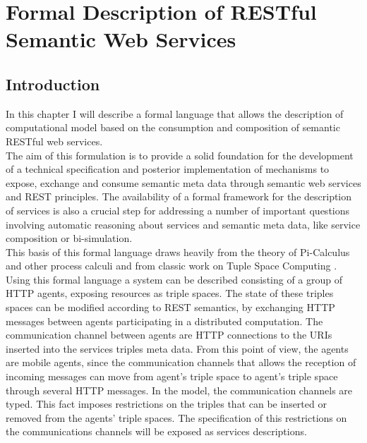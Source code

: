 \chapter{Formal Description of RESTful Semantic Web Services  \label{capituloFD}}

\section{Introduction}
In this chapter I will describe a formal language that allows the description of computational model based on the consumption
and composition of semantic RESTful web services.\\

The aim of this formulation is to provide a solid foundation for the development of a technical specification and
posterior implementation of mechanisms to expose, exchange and consume semantic meta data through semantic web services
and REST principles. The availability of a formal framework for the description of services is also a crucial step for
addressing a number of important questions involving automatic reasoning about services and semantic meta data, like
service composition or bi-simulation.\\

This basis of this formal language draws heavily from the theory of
Pi-Calculus \cite{Milner99communicating} and other process calculi and from classic work on Tuple Space Computing
\cite{Gelernter85generativecommunication}.\\

Using this formal language a system can be described consisting of a group of HTTP agents, exposing resources as
triple spaces. The state of these triples spaces can be modified according to REST semantics, by exchanging HTTP messages between agents
participating in a distributed computation. The communication channel between agents are HTTP connections to the URIs
inserted into the services triples meta data. From this point of view, the agents are mobile agents, since the
communication channels that allows the reception of incoming messages can move from agent's triple space to agent's
triple space through several HTTP messages. In the model, the communication channels are typed. This fact imposes
restrictions on the triples that can be inserted or removed from the agents' triple spaces. The specification of this
restrictions on the communications channels will be exposed as services descriptions.

